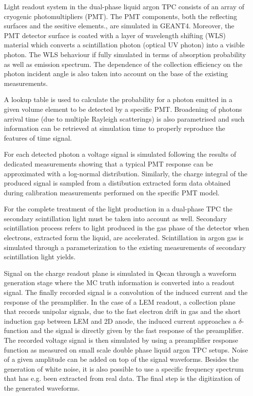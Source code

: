 Light readout system in the dual-phase liquid argon TPC consists of an array of cryogenic photomultipliers (PMT).
The PMT components, both the reflecting surfaces and the sesitive elements., are simulated in GEANT4.
Moreover, the PMT detector surface is coated with a layer of wavelength shifting (WLS) material which converts a
scintillation photon (optical UV photon) into a visible photon. The WLS behaviour if fully simulated in
terms of absorption probability as well as emission spectrum.
The dependence of the collection efficiency on the photon incident angle is also taken into account on the base
of the existing measurements.  

A lookup table is used to calculate the probability for a photon emitted in a
given volume element to be detected by a specific PMT.
Broadening of photons arrival time (due to multiple Rayleigh scatterings)
is also parametrised and such information can be retrieved at simulation time
to properly reproduce the features of time signal.

For each detected photon a voltage signal is simulated following the results of dedicated 
measurements showing that a typical PMT response can be approximated with a log-normal distribution.
Similarly, the charge integral of the produced signal is sampled from a distibution extracted form data obtained during calibration measurements
performed on the specific PMT model.

For the complete treatment of the light production in a dual-phase TPC
the secondary scintillation light must be taken into account as well.
Secondary scintillation process refers to light produced in the gas phase of the detector when electrons, extracted form the liquid, are accelerated.
Scintillation in argon gas is simulated through a parameterization to the existing measurements of secondary scintillation light yields.

Signal on the charge readout plane is simulated in Qscan through a waveform generation stage where the MC truth information
is converted into a readout signal. 
The finally recorded signal  is a convolution of the induced current and the response of the preamplifier.
In the case of a LEM readout, 
a collection plane that records unipolar signals,  due to the fast electron drift in gas and the short induction gap between LEM and 2D anode, 
the induced current approaches a $\delta$-function and the signal is directly given by the fast response of the preamplifier.
The recorded voltage signal is then simulated by using a preamplifier response function
as measured on small scale double phase liquid argon TPC setups. 
Noise of a given amplitude can be added on top of the signal waveforms.
Besides the generation of white noise, it is also possible to use a specific frequency spectrum that has e.g. been extracted from real data. 
The final step is the digitization of the generated waveforms.


